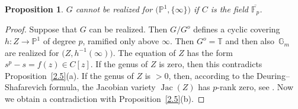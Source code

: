 \documentclass[10pt,a4paper]{amsart}
\numberwithin{equation}{section}
\newtheorem{Proposition}[Theorem]{Proposition}
\begin{document}
\begin{Proposition} \label{2.6} $G$ cannot be realized for $\big(\mathbb{P}^1,\{\infty \}\big)$ if $C$ is the field $\overline{\mathbb{F}_p}$.
\end{Proposition}
\begin{proof} Suppose that $G$ can be realized. Then $G/G^o$ defines a cyclic covering $h\colon Z\rightarrow \mathbb{P}^1$ of degree $p$, ramified only above $\infty$. Then $G^o=\mathbb{T}$ and then also~$\mathbb{G}_m$ are realized for $\big(Z,h^{-1}(\infty)\big)$. The equation of $Z$ has the form $s^p-s=f(z)\in C[z]$. If the genus of $Z$ is zero, then this contradicts Proposition~\ref{2.5}(a). If the genus of $Z$ is $>0$, then, according to the Deuring--Shafarevich formula, the Jacobian variety $\operatorname{Jac}(Z)$ has $p$-rank zero, see \cite[Theorem~1.1]{Sh}. Now we obtain a contradiction with Proposition~\ref{2.5}(b). \end{proof}
\end{document}
